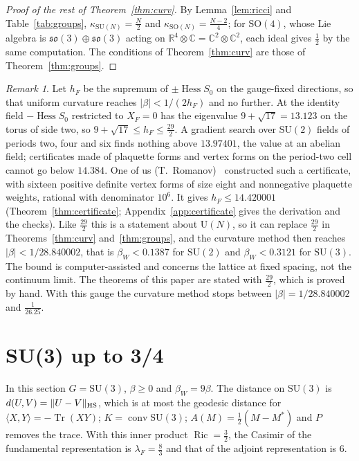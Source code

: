\documentclass[11pt]{amsart}
\theoremstyle{definition}
\theoremstyle{remark}
\newtheorem{remark}[theorem]{Remark}
\numberwithin{equation}{section}
\newcommand{\R}{\mathbb{R}}
\newcommand{\C}{\mathbb{C}}
\newcommand{\SU}{\mathrm{SU}}
\newcommand{\SO}{\mathrm{SO}}
\newcommand{\U}{\mathrm{U}}
\newcommand{\Tr}{\operatorname{Tr}}
\newcommand{\Hess}{\operatorname{Hess}}
\newcommand{\Ric}{\operatorname{Ric}}
\newcommand{\ip}[2]{\langle #1,#2\rangle}
\begin{document}
\begin{proof}[Proof of the rest of Theorem~\ref{thm:curv}]
By Lemma~\ref{lem:ricci} and Table~\ref{tab:groups}, $\kappa_{\SU(N)}=\frac N2$
and $\kappa_{\SO(N)}=\frac{N-2}4$; for $\SO(4)$, whose Lie algebra is
$\mathfrak{so}(3)\oplus\mathfrak{so}(3)$ acting on $\R^4\otimes\C=\C^2\otimes\C^2$,
each ideal gives $\frac12$ by the same computation. The conditions of Theorem~\ref{thm:curv}
are those of Theorem~\ref{thm:groups}.
\end{proof}

\begin{remark}\label{rem:hf}
Let $h_F$ be the supremum of $\pm\Hess S_0$ on the gauge-fixed directions, so
that uniform curvature reaches $|\beta|<1/(2h_F)$ and no further. At the
identity field $-\Hess S_0$ restricted to $X_F=0$ has the eigenvalue
$9+\sqrt{17}=13.123$ on the torus of side two, so $9+\sqrt{17}\le h_F\le\frac{29}2$.
A gradient search over $\SU(2)$ fields of periods two, four and six finds
nothing above $13.97401$, the value at an abelian field; certificates made of
plaquette forms and vertex forms on the period-two cell cannot go below
$14.384$. One of us (T.~Romanov)~\cite{Rom26} constructed such a certificate, with sixteen
positive definite vertex forms of size eight and nonnegative plaquette
weights, rational with denominator $10^6$. It gives $h_F\le14.420001$
(Theorem~\ref{thm:certificate}; Appendix~\ref{app:certificate} gives the
derivation and the checks). Like $\frac{29}2$ this is a statement about
$\U(N)$, so it can replace $\frac{29}2$ in Theorems~\ref{thm:curv}
and~\ref{thm:groups}, and the curvature method then reaches
$|\beta|<1/28.840002$, that is $\beta_W<0.1387$ for $\SU(2)$ and
$\beta_W<0.3121$ for $\SU(3)$. The bound is computer-assisted and concerns
the lattice at fixed spacing, not the continuum limit. The theorems of this
paper are stated with $\frac{29}2$, which is proved by hand.
With this gauge the curvature method stops between $|\beta|=1/28.840002$
and $\frac1{26.25}$.
\end{remark}

\section{SU(3) up to 3/4}\label{sec:su3}

In this section $G=\SU(3)$, $\beta\ge0$ and $\beta_W=9\beta$. The distance on
$\SU(3)$ is $d(U,V)=\|U-V\|_{\rm HS}$, which is at most the geodesic distance
for $\ip XY=-\Tr(XY)$; $K=\operatorname{conv}\SU(3)$; $A(M)=\frac12(M-M^*)$
and $P$ removes the trace. With this inner product $\Ric=\frac32$, the
Casimir of the fundamental representation is $\lambda_F=\frac83$ and that of
the adjoint representation is $6$.
\end{document}
